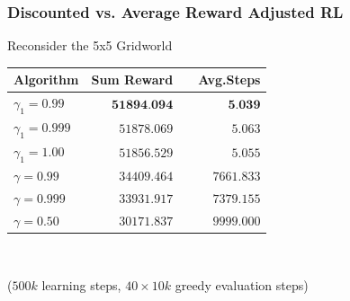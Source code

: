 \documentclass[xcolor=table%
,t]{beamer}
\begin{document}
\begin{frame}
  \frametitle{Discounted vs. Average Reward Adjusted RL}
  \begin{block}{Reconsider the 5x5 Gridworld~\footnotemark}
    \centering
    \begin{tabular}{@{}lrcr@{}}
      \toprule
      Algorithm & \multicolumn{1}{c}{Sum Reward}  & &\multicolumn{1}{c}{Avg.\@ Steps}\\
      \midrule
      \ARA{} \(\gamma_1=0.99\)  & \cellcolor{gr}\(\textbf{51894.094}\) & & \(\textbf{5.039}\)\\
      \ARA{} \(\gamma_1=0.999\) & \cellcolor{gr}\(51878.069\)          & & \cellcolor{gr}\(5.063\)\\
      \ARA{} \(\gamma_1=1.00\)  & \cellcolor{gr}\(51856.529\)          & & \cellcolor{gr}\(5.055\)\\
      \hhline{|~|-|~|-|}
      \QL{}  \(\gamma=0.99\)  & \cellcolor{gr2}\(34409.464\)         & & \cellcolor{gr2}\(7661.833\)  \\
      \QL{}  \(\gamma=0.999\) & \cellcolor{gr2}\(33931.917\)         & & \cellcolor{gr2}\(7379.155\) \\
      \QL{}  \(\gamma=0.50\)  & \(30171.837\)                        & &  \(9999.000\)\\
      \bottomrule
    \end{tabular}\\[0.5em]
    \begin{minipage}{\textwidth}
      \centering
      {\footnotesize (\(500k\) learning steps, \(40 \times 10k\) greedy evaluation steps)}

    \end{minipage}

  \end{block}
\end{frame}
\end{document}
